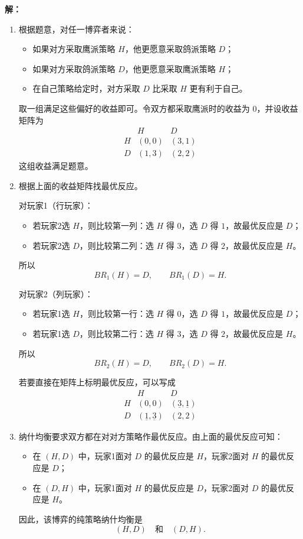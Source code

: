 \documentclass[12pt,a4paper]{article}
\begin{document}
\noindent\textbf{解：}
\begin{enumerate}[label=\alph*.]
  \item
  根据题意，对任一博弈者来说：
  \begin{itemize}
    \item 如果对方采取鹰派策略 \(H\)，他更愿意采取鸽派策略 \(D\)；
    \item 如果对方采取鸽派策略 \(D\)，他更愿意采取鹰派策略 \(H\)；
    \item 在自己策略给定时，对方采取 \(D\) 比采取 \(H\) 更有利于自己。
  \end{itemize}

  取一组满足这些偏好的收益即可。令双方都采取鹰派时的收益为 \(0\)，并设收益矩阵为
  \[
  \begin{array}{c|cc}
   & H & D\\
  \hline
  H & (0,0) & (3,1)\\
  D & (1,3) & (2,2)
  \end{array}
  \]
  这组收益满足题意。

  \item
  根据上面的收益矩阵找最优反应。

  对玩家1（行玩家）：
  \begin{itemize}
    \item 若玩家2选 \(H\)，则比较第一列：选 \(H\) 得 \(0\)，选 \(D\) 得 \(1\)，故最优反应是 \(D\)；
    \item 若玩家2选 \(D\)，则比较第二列：选 \(H\) 得 \(3\)，选 \(D\) 得 \(2\)，故最优反应是 \(H\)。
  \end{itemize}
  所以
  \[
  BR_1(H)=D,\qquad BR_1(D)=H.
  \]

  对玩家2（列玩家）：
  \begin{itemize}
    \item 若玩家1选 \(H\)，则比较第一行：选 \(H\) 得 \(0\)，选 \(D\) 得 \(1\)，故最优反应是 \(D\)；
    \item 若玩家1选 \(D\)，则比较第二行：选 \(H\) 得 \(3\)，选 \(D\) 得 \(2\)，故最优反应是 \(H\)。
  \end{itemize}
  所以
  \[
  BR_2(H)=D,\qquad BR_2(D)=H.
  \]

  若要直接在矩阵上标明最优反应，可以写成
  \[
  \begin{array}{c|cc}
   & H & D\\
  \hline
  H & (0,0) & (\underline{3},\underline{1})\\
  D & (\underline{1},\underline{3}) & (2,2)
  \end{array}
  \]

  \item
  纳什均衡要求双方都在对对方策略作最优反应。由上面的最优反应可知：
  \begin{itemize}
    \item 在 \((H,D)\) 中，玩家1面对 \(D\) 的最优反应是 \(H\)，玩家2面对 \(H\) 的最优反应是 \(D\)；
    \item 在 \((D,H)\) 中，玩家1面对 \(H\) 的最优反应是 \(D\)，玩家2面对 \(D\) 的最优反应是 \(H\)。
  \end{itemize}
  因此，该博弈的纯策略纳什均衡是
  \[
  (H,D)\quad \text{和}\quad (D,H).
  \]


\end{enumerate}
\end{document}
